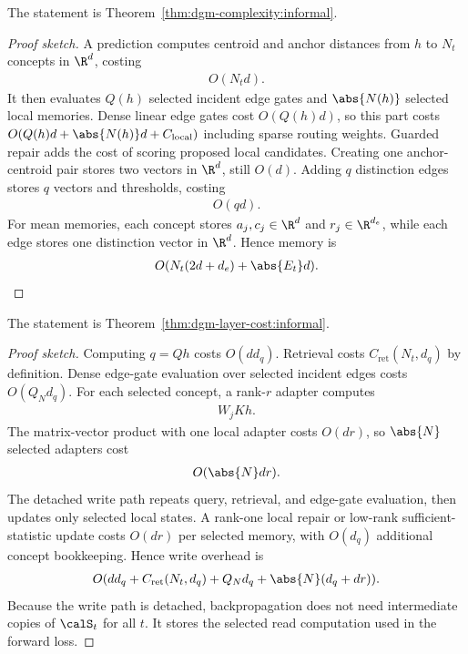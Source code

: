\begin{theorem}
\label{thm:dgm-complexity:sketch}
The statement is Theorem~\ref{thm:dgm-complexity:informal}.
\end{theorem}
\begin{proof}[Proof sketch]
A prediction computes centroid and anchor distances from $h$ to $N_t$ concepts in $\R^d$, costing
\begin{align*}
O(N_td).
\end{align*}
It then evaluates $Q(h)$ selected incident edge gates and $\abs{N(h)}$ selected local memories. Dense linear edge gates cost $O(Q(h)d)$, so this part costs $O(Q(h)d+\abs{N(h)}d+C_{\mathrm{local}})$ including sparse routing weights. Guarded repair adds the cost of scoring proposed local candidates. Creating one anchor-centroid pair stores two vectors in $\R^d$, still $O(d)$. Adding $q$ distinction edges stores $q$ vectors and thresholds, costing
\begin{align*}
O(qd).
\end{align*}
For mean memories, each concept stores $a_j,c_j\in\R^d$ and $r_j\in\R^{d_e}$, while each edge stores one distinction vector in $\R^d$. Hence memory is
\begin{align*}
O(N_t(2d+d_e)+\abs{E_t}d).
\end{align*}
\end{proof}

\begin{theorem}
\label{thm:dgm-layer-cost:sketch}
The statement is Theorem~\ref{thm:dgm-layer-cost:informal}.
\end{theorem}
\begin{proof}[Proof sketch]
Computing $q=Qh$ costs $O(dd_q)$. Retrieval costs $C_{\mathrm{ret}}(N_t,d_q)$ by definition. Dense edge-gate evaluation over selected incident edges costs $O(Q_N d_q)$. For each selected concept, a rank-$r$ adapter computes
\begin{align*}
W_jKh.
\end{align*}
The matrix-vector product with one local adapter costs $O(dr)$, so $\abs{N}$ selected adapters cost
\begin{align*}
O(\abs{N}dr).
\end{align*}
The detached write path repeats query, retrieval, and edge-gate evaluation, then updates only selected local states. A rank-one local repair or low-rank sufficient-statistic update costs $O(dr)$ per selected memory, with $O(d_q)$ additional concept bookkeeping. Hence write overhead is
\begin{align*}
O(dd_q+C_{\mathrm{ret}}(N_t,d_q)+Q_N d_q+\abs{N}(d_q+dr)).
\end{align*}
Because the write path is detached, backpropagation does not need intermediate copies of $\calS_t$ for all $t$. It stores the selected read computation used in the forward loss.
\end{proof}

